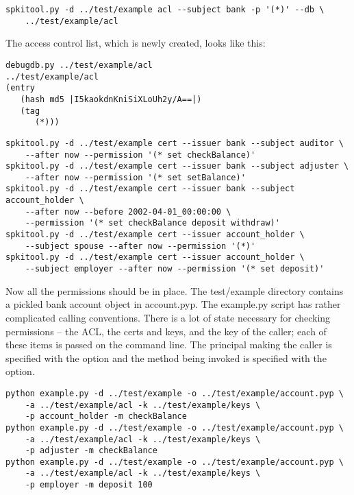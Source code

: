 \documentclass{howto}
\begin{document}
\begin{verbatim}
spkitool.py -d ../test/example acl --subject bank -p '(*)' --db \
    ../test/example/acl 
\end{verbatim}

The access control list, which is newly created, looks like this:

\begin{verbatim}
debugdb.py ../test/example/acl 
../test/example/acl
(entry 
   (hash md5 |I5kaokdnKniSiXLoUh2y/A==|)
   (tag 
      (*)))
\end{verbatim}

\begin{verbatim}
spkitool.py -d ../test/example cert --issuer bank --subject auditor \
    --after now --permission '(* set checkBalance)' 
spkitool.py -d ../test/example cert --issuer bank --subject adjuster \
    --after now --permission '(* set setBalance)' 
spkitool.py -d ../test/example cert --issuer bank --subject account_holder \
    --after now --before 2002-04-01_00:00:00 \
    --permission '(* set checkBalance deposit withdraw)' 
spkitool.py -d ../test/example cert --issuer account_holder \
    --subject spouse --after now --permission '(*)' 
spkitool.py -d ../test/example cert --issuer account_holder \
    --subject employer --after now --permission '(* set deposit)' 
\end{verbatim}

Now all the permissions should be in place.  The test/example
directory contains a pickled bank account object in account.pyp.  The
example.py script has rather complicated calling conventions.  There
is a lot of state necessary for checking permissions -- the ACL, the
certs and keys, and the key of the caller; each of these items is
passed on the command line.  The principal making the caller is
specified with the  option and the method being
invoked is specified with the \programopt{-m method_name} option.

\begin{verbatim}
python example.py -d ../test/example -o ../test/example/account.pyp \
    -a ../test/example/acl -k ../test/example/keys \
    -p account_holder -m checkBalance
python example.py -d ../test/example -o ../test/example/account.pyp \
    -a ../test/example/acl -k ../test/example/keys \
    -p adjuster -m checkBalance
python example.py -d ../test/example -o ../test/example/account.pyp \
    -a ../test/example/acl -k ../test/example/keys \
    -p employer -m deposit 100
\end{verbatim}
\end{document}
